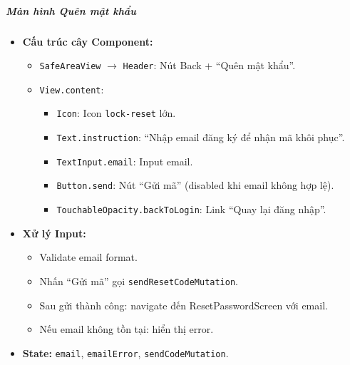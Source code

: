 \subparagraph{Màn hình Quên mật khẩu}
\begin{itemize}
    \item \textbf{Cấu trúc cây Component:}
        \begin{itemize}
            \item \texttt{SafeAreaView} $\rightarrow$ \texttt{Header}: Nút Back + ``Quên mật khẩu''.
            \item \texttt{View.content}:
                \begin{itemize}
                    \item \texttt{Icon}: Icon \texttt{lock-reset} lớn.
                    \item \texttt{Text.instruction}: ``Nhập email đăng ký để nhận mã khôi phục''.
                    \item \texttt{TextInput.email}: Input email.
                    \item \texttt{Button.send}: Nút ``Gửi mã'' (disabled khi email không hợp lệ).
                    \item \texttt{TouchableOpacity.backToLogin}: Link ``Quay lại đăng nhập''.
                \end{itemize}
        \end{itemize}
    \item \textbf{Xử lý Input:}
        \begin{itemize}
            \item Validate email format.
            \item Nhấn ``Gửi mã'' gọi \texttt{sendResetCodeMutation}.
            \item Sau gửi thành công: navigate đến ResetPasswordScreen với email.
            \item Nếu email không tồn tại: hiển thị error.
        \end{itemize}
    \item \textbf{State:} \texttt{email}, \texttt{emailError}, \texttt{sendCodeMutation}.
\end{itemize}

